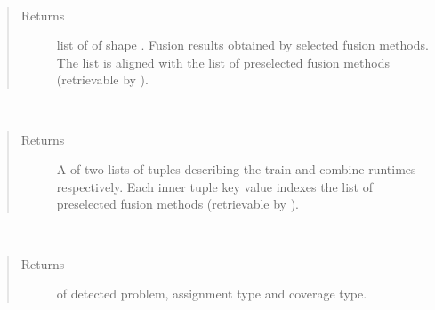 \documentclass[letterpaper,10pt,english]{sphinxmanual}
\begin{document}
\begin{fulllineitems}
\begin{fulllineitems}
\label{\detokenize{pusion.auto.auto_combiner:pusion.auto.auto_combiner.AutoCombiner.get_multi_combiner_decision_tensor}}~\begin{quote}\begin{description}
\item[{Returns}] \leavevmode
\sphinxAtStartPar
list of  of shape .
Fusion results obtained by selected fusion methods.
The list is aligned with the list of preselected fusion methods (retrievable by ).

\end{description}\end{quote}

\end{fulllineitems}


\begin{fulllineitems}
\label{\detokenize{pusion.auto.auto_combiner:pusion.auto.auto_combiner.AutoCombiner.get_multi_combiner_runtimes}}~\begin{quote}\begin{description}
\item[{Returns}] \leavevmode
\sphinxAtStartPar
A  of two lists of tuples describing the train and combine runtimes respectively.
Each inner tuple key value indexes the list of preselected fusion methods
(retrievable by ).

\end{description}\end{quote}

\end{fulllineitems}


\begin{fulllineitems}
\label{\detokenize{pusion.auto.auto_combiner:pusion.auto.auto_combiner.AutoCombiner.get_pac}}~\begin{quote}\begin{description}
\item[{Returns}] \leavevmode
\sphinxAtStartPar
{} of detected problem, assignment type and coverage type.


\end{description}
\end{quote}
\end{fulllineitems}
\end{fulllineitems}
\end{document}
